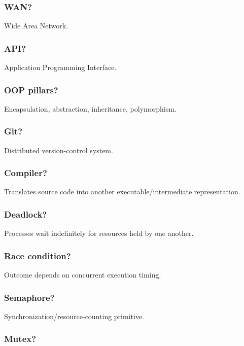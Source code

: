 \subsubsection{WAN?}

Wide Area Network.

\subsubsection{API?}

Application Programming Interface.

\subsubsection{OOP pillars?}

Encapsulation, abstraction, inheritance, polymorphism.

\subsubsection{Git?}

Distributed version-control system.

\subsubsection{Compiler?}

Translates source code into another executable/intermediate representation.

\subsubsection{Deadlock?}

Processes wait indefinitely for resources held by one another.

\subsubsection{Race condition?}

Outcome depends on concurrent execution timing.

\subsubsection{Semaphore?}

Synchronization/resource-counting primitive.

\subsubsection{Mutex?}

